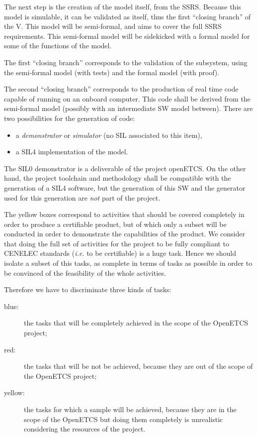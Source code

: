 \documentclass{template/openetcs_article}
\begin{document}
The next step is the creation of the model itself, from the SSRS. Because this model is simulable, 
it can be validated as itself, thus the first ``closing branch'' of the V. This model will be 
semi-formal, and aims to cover the full SSRS requirements. This semi-formal model will be sidekicked with 
a formal model for some of the functions of the model.

The first ``closing branch'' corresponds to the validation of the subsystem, using the semi-formal model
(with tests) and the formal model (with proof).

The second ``closing branch'' corresponds to the production of real time code capable of running on an 
onboard computer. This code shall be derived from the semi-formal model (possibly with an intermediate
SW model between). There are two possibilities for the generation of code:
\begin{itemize}
\item a \emph{demonstrator} or \emph{simulator} (no SIL associated to this item),
\item a SIL4 implementation of the model.
\end{itemize}

The SIL0 demonstrator is a deliverable of the project openETCS. On the other hand, the project toolchain and 
methodology shall be compatible with the generation of a SIL4 software, but the generation of this SW 
and the generator used for this generation are \emph{not} part of the project.

The yellow boxes correspond to activities that should be covered completely in order to produce 
a certifiable product, but of which only a subset will be conducted in order to demonstrate the 
capabilities of the product. We consider that doing the full set of activities for the project to 
be fully compliant to CENELEC standards (\emph{i.e.} to be certifiable) is a huge task. Hence we 
should isolate a subset of this tasks, as complete in terms of tasks as possible in order to be 
convinced of the feasibility of the whole activities. 

Therefore we have to discriminate three kinds of tasks:
\begin{description}
\item[blue:] the tasks that will be completely achieved in the scope of the OpenETCS project;
\item[red:] the tasks that will be not be achieved, because they are out of the scope of the OpenETCS project;
\item[yellow:] the tasks for which a sample will be achieved, because they are in the scope of the 
OpenETCS but doing them completely is unrealistic considering the resources of the project.
\end{description}
\end{document}
